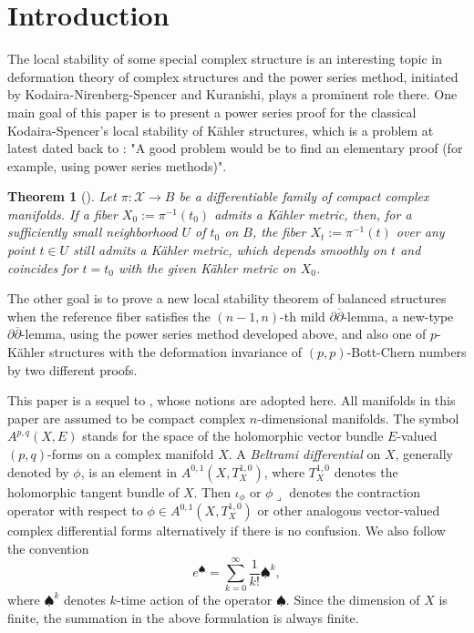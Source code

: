 \documentclass[12pt]{amsart}
\numberwithin{equation}{section}
\newtheorem{theorem} {Theorem} [section]
\renewcommand{\1}{\mathds{1}}
\newcommand{\db}{\overline{\partial}}
\renewcommand{\>}{\rightarrow}
\newcommand{\p}{\partial}
\def\p{\partial}
\begin{document}
\tableofcontents

\section{Introduction}
The local stability of some special complex structure is an
interesting topic in deformation theory of complex structures and
the power series method, initiated by Kodaira-Nirenberg-Spencer and Kuranishi,
plays a prominent role there. One main goal
of this paper is to present a power series proof for the classical
Kodaira-Spencer's local stability of K\"ahler structures, which is a
problem at latest dated back to \cite[Remark 1 on Page 180]{MK}: "A
good problem would be to find an elementary proof (for example,
using power series methods)".
\begin{theorem}[{\cite[Theorem 15]{KS}}]\label{stab-Kahler}
Let $\pi: \mathcal{X} \rightarrow B$ be a differentiable family of compact complex manifolds. If a fiber $X_0:= \pi^{-1}(t_0)$ admits a K\"ahler metric, then, for a sufficiently small neighborhood $U$ of $t_0$ on $B$, the fiber $X_t:=\pi^{-1}(t)$ over any point $t\in U$ still admits a K\"ahler metric, which depends smoothly on $t$ and coincides for $t=t_0$ with the given K\"ahler metric on $X_0$.
\end{theorem}

The other goal is to prove a new local stability theorem of balanced
structures when the reference fiber satisfies the $(n-1,n)$-th mild
$\p\db$-lemma, a new-type $\p\db$-lemma, using the power series
method developed above, and also one of $p$-K\"{a}hler structures with the deformation invariance of $(p,p)$-Bott-Chern numbers
by two different proofs.


This paper is a sequel to \cite{lry,RZ15}, whose notions are
adopted here. All manifolds in this paper are assumed to be compact
complex $n$-dimensional manifolds. The symbol $A^{p,q}(X,E)$ stands for the space of
the holomorphic vector bundle $E$-valued $(p,q)$-forms on a
complex manifold $X$. A \emph{Beltrami differential} on $X$, generally
denoted by $\phi$, is an element in
$A^{0,1}(X, T^{1,0}_X)$, where $T^{1,0}_X$ denotes the holomorphic
tangent bundle of $X$. Then $\iota_\phi$ or $\phi\lrcorner$ denotes
the contraction operator with respect to $\phi\in A^{0,1}(X,T^{1,0}_X)$ or
other analogous vector-valued complex differential forms alternatively if there
is no confusion. We also follow the convention
\begin{equation}\label{0e-convention}
e^{\spadesuit}=\sum_{k=0}^\infty \frac{1}{k!} \spadesuit^{k},
\end{equation}
where $\spadesuit^{k}$ denotes $k$-time action of the operator
$\spadesuit$. Since the dimension of $X$ is finite, the summation in
the above formulation is always finite.
\end{document}
